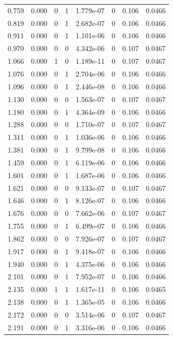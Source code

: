 \documentclass[preview]{standalone}
\begin{document}
{{\begin{tabular}{L{1.2cm}C{1.2cm} C{0.3cm}C{0.5cm} C{1.4cm}C{1.4cm} C{1.4cm}C{1.4cm}}
  0.759  &  0.000  & 0     &  1 &  1.779e-07  & 0  & 0.106 &  0.0466   \\ 
  0.819  &  0.000  & 0     &  1 &  2.682e-07  & 0  & 0.106 &  0.0466   \\ 
  0.911  &  0.000  & 0     &  1 &  1.101e-06  & 0  & 0.106 &  0.0466   \\ 
  0.970  &  0.000  & 0     &  0 &  4.342e-06  & 0  & 0.107 &  0.0467   \\ 
  1.066  &  0.000  & 1     &  0 &  1.189e-11  & 0  & 0.107 &  0.0467   \\ 
  1.076  &  0.000  & 0     &  1 &  2.704e-06  & 0  & 0.106 &  0.0466   \\ 
  1.096  &  0.000  & 0     &  1 &  2.446e-08  & 0  & 0.106 &  0.0466   \\ 
  1.130  &  0.000  & 0     &  0 &  1.563e-07  & 0  & 0.107 &  0.0467   \\ 
  1.180  &  0.000  & 0     &  1 &  4.364e-09  & 0  & 0.106 &  0.0466   \\ 
  1.288  &  0.000  & 0     &  0 &  1.710e-07  & 0  & 0.107 &  0.0467   \\ 
  1.311  &  0.000  & 0     &  1 &  1.036e-06  & 0  & 0.106 &  0.0466   \\ 
  1.381  &  0.000  & 0     &  1 &  9.799e-08  & 0  & 0.106 &  0.0466   \\ 
  1.459  &  0.000  & 0     &  1 &  6.119e-06  & 0  & 0.106 &  0.0466   \\ 
  1.601  &  0.000  & 0     &  1 &  1.687e-06  & 0  & 0.106 &  0.0466   \\ 
  1.621  &  0.000  & 0     &  0 &  9.133e-07  & 0  & 0.107 &  0.0467   \\ 
  1.646  &  0.000  & 0     &  1 &  8.126e-07  & 0  & 0.106 &  0.0466   \\ 
  1.676  &  0.000  & 0     &  0 &  7.662e-06  & 0  & 0.107 &  0.0467   \\ 
  1.755  &  0.000  & 0     &  1 &  6.499e-07  & 0  & 0.106 &  0.0466   \\ 
  1.862  &  0.000  & 0     &  0 &  7.926e-07  & 0  & 0.107 &  0.0467   \\ 
  1.917  &  0.000  & 0     &  1 &  9.418e-07  & 0  & 0.106 &  0.0466   \\ 
  1.940  &  0.000  & 0     &  1 &  4.375e-06  & 0  & 0.106 &  0.0466   \\ 
  2.101  &  0.000  & 0     &  1 &  7.952e-07  & 0  & 0.106 &  0.0466   \\ 
  2.135  &  0.000  & 1     &  1 &  1.617e-11  & 0  & 0.106 &  0.0465   \\ 
  2.138  &  0.000  & 0     &  1 &  1.365e-05  & 0  & 0.106 &  0.0466   \\ 
  2.172  &  0.000  & 0     &  0 &  3.514e-06  & 0  & 0.107 &  0.0467   \\ 
  2.191  &  0.000  & 0     &  1 &  3.316e-06  & 0  & 0.106 &  0.0466   \\ 
\hline 
\end{tabular} 

}}
\end{document}
